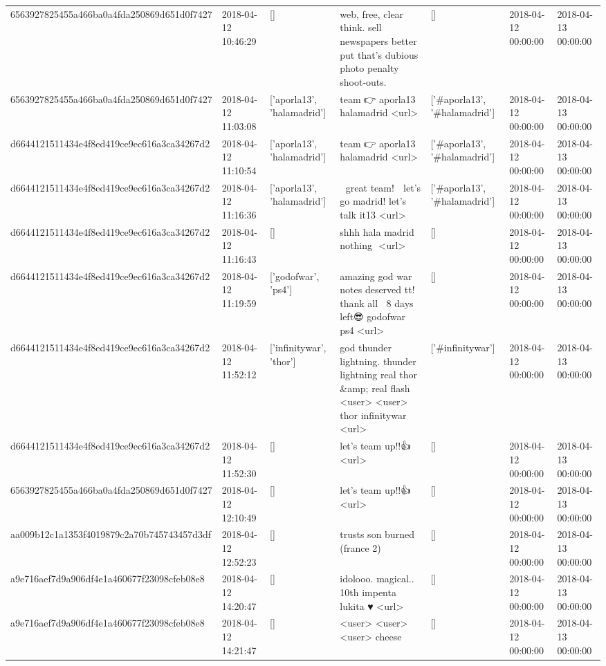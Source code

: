 \begin{tabular}{lllllll}
6563927825455a466ba0a4fda250869d651d0f7427 & 2018-04-12 10:46:29 & [] & web, free, clear think. sell newspapers better put that's dubious photo penalty shoot-outs. & [] & 2018-04-12 00:00:00 & 2018-04-13 00:00:00 \\
6563927825455a466ba0a4fda250869d651d0f7427 & 2018-04-12 11:03:08 & ['aporla13', 'halamadrid'] & team 👉 aporla13 halamadrid <url> & ['#aporla13', '#halamadrid'] & 2018-04-12 00:00:00 & 2018-04-13 00:00:00 \\
d6644121511434e4f8ed419ce9ec616a3ca34267d2 & 2018-04-12 11:10:54 & ['aporla13', 'halamadrid'] & team 👉 aporla13 halamadrid <url> & ['#aporla13', '#halamadrid'] & 2018-04-12 00:00:00 & 2018-04-13 00:00:00 \\
d6644121511434e4f8ed419ce9ec616a3ca34267d2 & 2018-04-12 11:16:36 & ['aporla13', 'halamadrid'] & 👏 great team! 👏 let's go madrid! let's talk it13 <url> & ['#aporla13', '#halamadrid'] & 2018-04-12 00:00:00 & 2018-04-13 00:00:00 \\
d6644121511434e4f8ed419ce9ec616a3ca34267d2 & 2018-04-12 11:16:43 & [] & shhh hala madrid nothing ️️ <url> & [] & 2018-04-12 00:00:00 & 2018-04-13 00:00:00 \\
d6644121511434e4f8ed419ce9ec616a3ca34267d2 & 2018-04-12 11:19:59 & ['godofwar', 'ps4'] & amazing god war notes deserved tt! thank all💪😀 8 days left😎 godofwar ps4 <url> & [] & 2018-04-12 00:00:00 & 2018-04-13 00:00:00 \\
d6644121511434e4f8ed419ce9ec616a3ca34267d2 & 2018-04-12 11:52:12 & ['infinitywar', 'thor'] & god thunder lightning. thunder lightning real thor \&amp; real flash <user> <user> thor infinitywar <url> & ['#infinitywar'] & 2018-04-12 00:00:00 & 2018-04-13 00:00:00 \\
d6644121511434e4f8ed419ce9ec616a3ca34267d2 & 2018-04-12 11:52:30 & [] & let's team up!!👍 <url> & [] & 2018-04-12 00:00:00 & 2018-04-13 00:00:00 \\
6563927825455a466ba0a4fda250869d651d0f7427 & 2018-04-12 12:10:49 & [] & let's team up!!👍 <url> & [] & 2018-04-12 00:00:00 & 2018-04-13 00:00:00 \\
aa009b12c1a1353f4019879c2a70b745743457d3df & 2018-04-12 12:52:23 & [] & trusts son burned (france 2) & [] & 2018-04-12 00:00:00 & 2018-04-13 00:00:00 \\
a9e716aef7d9a906df4e1a460677f23098cfeb08e8 & 2018-04-12 14:20:47 & [] & idolooo. magical.. 10th impenta lukita ♥️ <url> & [] & 2018-04-12 00:00:00 & 2018-04-13 00:00:00 \\
a9e716aef7d9a906df4e1a460677f23098cfeb08e8 & 2018-04-12 14:21:47 & [] & <user> <user> <user> cheese & [] & 2018-04-12 00:00:00 & 2018-04-13 00:00:00 \\

\end{tabular}

